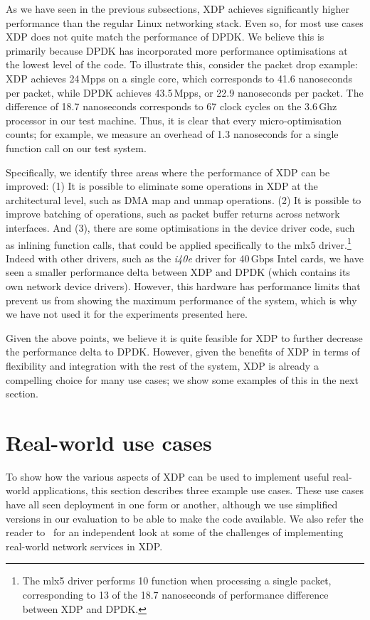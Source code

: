 \documentclass[sigconf]{acmart}
\begin{document}
As we have seen in the previous subsections, XDP achieves significantly higher
performance than the regular Linux networking stack. Even so, for most use cases
XDP does not quite match the performance of DPDK. We believe this is primarily
because DPDK has incorporated more performance optimisations at the lowest level
of the code. To illustrate this, consider the packet drop example: XDP achieves
24\,Mpps on a single core, which corresponds to 41.6 nanoseconds per packet,
while DPDK achieves 43.5\,Mpps, or 22.9 nanoseconds per packet. The difference
of 18.7 nanoseconds corresponds to 67 clock cycles on the 3.6\,Ghz processor in
our test machine. Thus, it is clear that every micro-optimisation counts; for
example, we measure an overhead of 1.3 nanoseconds for a single function call on
our test system.

Specifically, we identify three areas where the performance of XDP can be
improved: (1) It is possible to eliminate some operations in XDP at the
architectural level, such as DMA map and unmap operations. (2) It is possible to
improve batching of operations, such as packet buffer returns across network
interfaces. And (3), there are some optimisations in the device driver code,
such as inlining function calls, that could be applied specifically to the mlx5
driver.\footnote{The mlx5 driver performs 10 function when processing a single
  packet, corresponding to 13 of the 18.7 nanoseconds of performance difference
  between XDP and DPDK.} Indeed with other drivers, such as the \emph{i40e}
driver for 40\,Gbps Intel cards, we have seen a smaller performance delta
between XDP and DPDK (which contains its own network device drivers). However,
this hardware has performance limits that prevent us from showing the maximum
performance of the system, which is why we have not used it for the experiments
presented here.

Given the above points, we believe it is quite feasible for XDP to further
decrease the performance delta to DPDK. However, given the benefits of XDP in
terms of flexibility and integration with the rest of the system, XDP is already
a compelling choice for many use cases; we show some examples of this in the
next section.

\section{Real-world use cases}
\label{sec:usecases}
To show how the various aspects of XDP can be used to implement useful
real-world applications, this section describes three example use cases. These
use cases have all seen deployment in one form or another, although we use
simplified versions in our evaluation to be able to make the code available. We
also refer the reader to~\cite{miano2018creating} for an independent look at
some of the challenges of implementing real-world network services in XDP.
\end{document}
